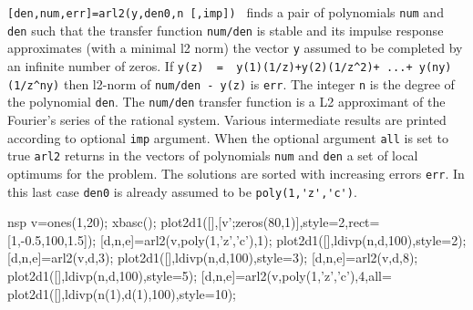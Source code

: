\begin{mandescription}
  \verb![den,num,err]=arl2(y,den0,n [,imp]) ! finds a pair of polynomials
  \verb!num! and \verb!den! such that the transfer function \verb!num/den!
  is stable and its impulse response approximates (with a minimal l2
  norm) the vector \verb!y! assumed to be completed by an infinite number of zeros.
  If \verb!y(z)  =  y(1)(1/z)+y(2)(1/z^2)+ ...+ y(ny)(1/z^ny)!
  then l2-norm of \verb!num/den - y(z)! is \verb!err!. The integer 
  \verb!n! is the degree of the polynomial \verb!den!.
  The \verb!num/den!  transfer function is a L2 approximant of the
  Fourier's series of the rational system.
  Various intermediate results are printed according to optional \verb!imp! argument. 
  When the optional argument \verb!all! is set to true \verb!arl2! returns in the
  vectors of polynomials \verb!num! and \verb!den!  a set of local
  optimums for the problem. The solutions are sorted with increasing
  errors \verb!err!. In this last case \verb!den0! is already assumed to be 
  \verb!poly(1,'z','c')!.
\end{mandescription}
\begin{examples}
  \begin{mintednsp}{nsp}
    v=ones(1,20);
    xbasc();
    plot2d1([],[v';zeros(80,1)],style=2,rect=[1,-0.5,100,1.5]);
    [d,n,e]=arl2(v,poly(1,'z','c'),1);
    plot2d1([],ldivp(n,d,100),style=2);
    [d,n,e]=arl2(v,d,3);
    plot2d1([],ldivp(n,d,100),style=3);
    [d,n,e]=arl2(v,d,8);
    plot2d1([],ldivp(n,d,100),style=5);
    [d,n,e]=arl2(v,poly(1,'z','c'),4,all=%
    plot2d1([],ldivp(n(1),d(1),100),style=10);
  \end{mintednsp}
\end{examples}
\begin{manseealso}
\end{manseealso}
